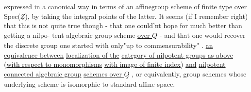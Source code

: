 expressed in a canonical way in terms of an affinegroup scheme 
of finite type over Spec($\underline{Z}$),  by taking the integral points of the
latter.  It seems (if I remember right)  that this is not quite true\xout{,}
though  -  that one could'nt hope for much better than getting a nilpo-%
tent algebraic group scheme \uline{over $\underline{Q}$}  -  and that one would recover the
discrete group one started with only\hand{\textbackslash}"up to commensurability" . 
 \uline{an equivalence between}  \uline{localization of the}
\uline{category of nilpotent groups as above} (\uline{with respect to monomorphisms}
\uline{with image of finite index})  \uline{and} \uline{nilpotent connected algebraic group}
\uline{schemes over $\underline{Q}$} ,  or equivalently,  group schemes whose underlying
scheme is isomorphic to standard affine space.

